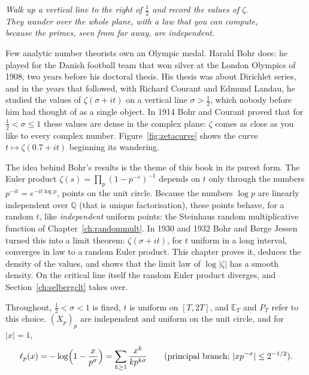 \begin{center}\itshape
Walk up a vertical line to the right of $\frac12$ and record the values of $\zeta$.\\
They wander over the whole plane, with a law that you can compute,\\
because the primes, seen from far away, are independent.
\end{center}

Few analytic number theorists own an Olympic medal. Harald Bohr does: he played for the Danish football team that won silver at the London Olympics of 1908, two years before his doctoral thesis. His thesis was about Dirichlet series, and in the years that followed, with Richard Courant and Edmund Landau, he studied the values of $\zeta(\sigma+it)$ on a vertical line $\sigma>\frac12$, which nobody before him had thought of as a single object. In 1914 Bohr and Courant proved that for $\frac12<\sigma\le1$ these values are dense in the complex plane: $\zeta$ comes as close as you like to every complex number. Figure~\ref{fig:zetacurve} shows the curve $t\mapsto\zeta(0.7+it)$ beginning its wandering.

The idea behind Bohr's results is the theme of this book in its purest form. The Euler product $\zeta(s)=\prod_p(1-p^{-s})^{-1}$ depends on $t$ only through the numbers $p^{-it}=e^{-it\log p}$, points on the unit circle. Because the numbers $\log p$ are linearly independent over $\mathbb Q$ (that is unique factorisation), these points behave, for a random $t$, like \emph{independent} uniform points: the Steinhaus random multiplicative function of Chapter~\ref{ch:randommult}. In 1930 and 1932 Bohr and Børge Jessen turned this into a limit theorem: $\zeta(\sigma+it)$, for $t$ uniform in a long interval, converges in law to a random Euler product. This chapter proves it, deduces the density of the values, and shows that the limit law of $\log|\zeta|$ has a smooth density. On the critical line itself the random Euler product diverges, and Section~\ref{ch:selbergclt} takes over.

Throughout, $\frac12<\sigma<1$ is fixed, $t$ is uniform on $[T,2T]$, and $\mathbb E_T$ and $P_T$ refer to this choice. $(X_p)_p$ are independent and uniform on the unit circle, and for $|x|=1$,
\[
\ell_p(x)=-\log\Bigl(1-\frac x{p^\sigma}\Bigr)=\sum_{k\ge1}\frac{x^k}{kp^{k\sigma}}\qquad(\text{principal branch; }|xp^{-\sigma}|\le2^{-1/2}).
\]


